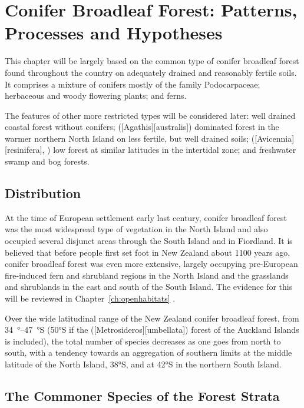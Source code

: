 \chapter{Conifer Broadleaf Forest: Patterns, Processes and Hypotheses}%
\label{ch:coniferpatterns}

This chapter will be largely based on the common type of conifer broadleaf forest found throughout the country on adequately drained and reasonably fertile soils.
It comprises a mixture of conifers mostly of the family Podocarpaceae; herbaceous and woody flowering plants; and ferns.

The features of other more restricted types will be considered later: well drained coastal forest without conifers;  ([Agathis][australis]) dominated forest in the warmer northern North Island on less fertile, but well drained soils;  ([Avicennia][resinifera], ) low forest at similar latitudes in the intertidal zone; and freshwater swamp and bog forests.

\section{Distribution}

At the time of European settlement early last century, conifer broadleaf forest was the most widespread type of vegetation in the North Island and also occupied several disjunct areas through the South Island and in Fiordland.
It is believed that before people first set foot in New Zealand about 1100 years ago, conifer broadleaf forest was even more extensive, largely occupying pre-European fire-induced fern and shrubland regions in the North Island and the grasslands and shrublands in the east and south of the South Island.
The evidence for this will be reviewed in Chapter~\ref{ch:openhabitats} .

Over the wide latitudinal range of the New Zealand conifer broadleaf forest, from \SIrange{34}{47}{\degree}S (\ang{50}S if the  ([Metrosideros][umbellata]) forest of the Auckland Islands is included), the total number of species decreases as one goes from north to south, with a tendency towards an aggregation of southern limits at the middle latitude of the North Island, \ang{38}S, and at \ang{42}S in the northern South Island.

\section{The Commoner Species of the Forest Strata}

